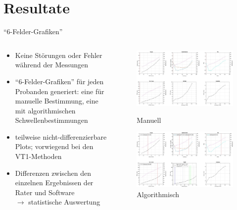 \documentclass[colorBG,slideColor,8pt]{beamer}
\begin{document}
\section{Resultate}

\begin{frame}{"`6-Felder-Grafiken"'}
\begin{columns}
	\begin{column}{0.5\linewidth}
		\begin{itemize}
			\item Keine Störungen oder Fehler während der Messungen
			\item "`6-Felder-Grafiken"' für jeden Probanden generiert: eine für manuelle Bestimmung, eine mit algorithmischen Schwellenbestimmungen
			\item teilweise nicht-differenzierbare Plots; vorwiegend bei den VT1-Methoden
			\item Differenzen zwischen den einzelnen Ergebnissen der Rater und Software\\$\rightarrow$ statistische Auswertung
		\end{itemize}
	\end{column}
	\begin{column}{0.5\linewidth}
		\begin{figure}[H]
			\centering
			\includegraphics[width=0.8\linewidth]{Bilder/plot_6w.jpg}
			\caption{Manuell}
			\includegraphics[width=0.8\linewidth]{Bilder/auto_6.png}
			\caption{Algorithmisch}
		\end{figure}
	\end{column}
\end{columns}
\end{frame}
\end{document}
